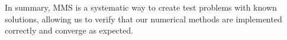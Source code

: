 \begin{deepeningbox}
    In summary, MMS is a systematic way to create test problems with known solutions, allowing us to verify that our numerical methods are implemented correctly and converge as expected.
\end{deepeningbox}